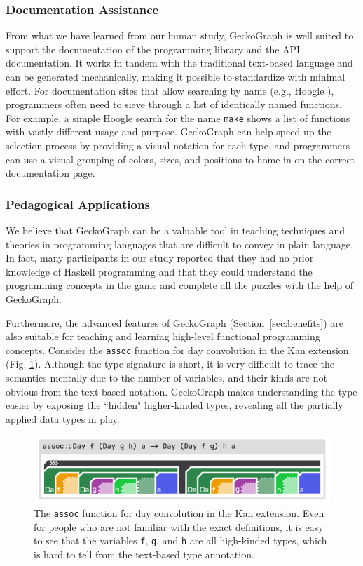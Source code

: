 \documentclass[preprint,12pt]{elsarticle}
\begin{document}
\subsubsection{Documentation Assistance}
From what we have learned from our human study, GeckoGraph is well suited to support the documentation of the programming library and the API documentation. It works in tandem with the traditional text-based language and can be generated mechanically, making it possible to standardize with minimal effort. For documentation sites that allow searching by name (e.g., Hoogle \cite{Mitchell_undated-fb}), programmers often need to sieve through a list of identically named functions. For example, a simple Hoogle search for the name \texttt{make} shows a list of functions with vastly different usage and purpose. GeckoGraph can help speed up the selection process by providing a visual notation for each type, and programmers can use a visual grouping of colors, sizes, and positions to home in on the correct documentation page.


\subsubsection{Pedagogical Applications}

We believe that GeckoGraph can be a valuable tool in teaching techniques and theories in programming languages that are difficult to convey in plain language. In fact, many participants in our study reported that they had no prior knowledge of Haskell programming and that they could understand the programming concepts in the game and complete all the puzzles with the help of GeckoGraph.

Furthermore, the advanced features of GeckoGraph (Section~\ref{sec:benefits}) are also suitable for teaching and learning high-level functional programming concepts. Consider the \texttt{assoc} function for day convolution \cite{Day1970-kb} in the Kan extension (Fig. \ref{fig:assoc}). Although the type signature is short, it is very difficult to trace the semantics mentally due to the number of variables, and their kinds are not obvious from the text-based notation. GeckoGraph makes understanding the type easier by exposing the ``hidden" higher-kinded types, revealing all the partially applied data types in play.

\begin{figure}[]
  \includegraphics[width=\linewidth]{figures/assoc}
  \caption{\label{fig:assoc} The \texttt{assoc} function for day convolution \cite{Day1970-kb} in the Kan extension. Even for people who are not familiar with the exact definitions, it is easy to see that the variables \texttt{f},  \texttt{g}, and \texttt{h} are all high-kinded types, which is hard to tell from the text-based type annotation.}
\end{figure}
\end{document}
